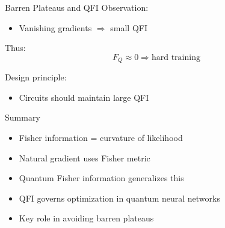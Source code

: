 \documentclass{beamer}
\begin{document}
\begin{frame}{Barren Plateaus and QFI}
Observation:
\begin{itemize}
\item Vanishing gradients $\Rightarrow$ small QFI
\end{itemize}

\pause

Thus:
\[
F_Q \approx 0 \Rightarrow \text{hard training}
\]

\pause

Design principle:
\begin{itemize}
\item Circuits should maintain large QFI
\end{itemize}

\end{frame}

\begin{frame}{Summary}
\begin{itemize}
\item Fisher information = curvature of likelihood
\item Natural gradient uses Fisher metric
\item Quantum Fisher information generalizes this
\item QFI governs optimization in quantum neural networks
\item Key role in avoiding barren plateaus
\end{itemize}

\end{frame}

\end{document}
